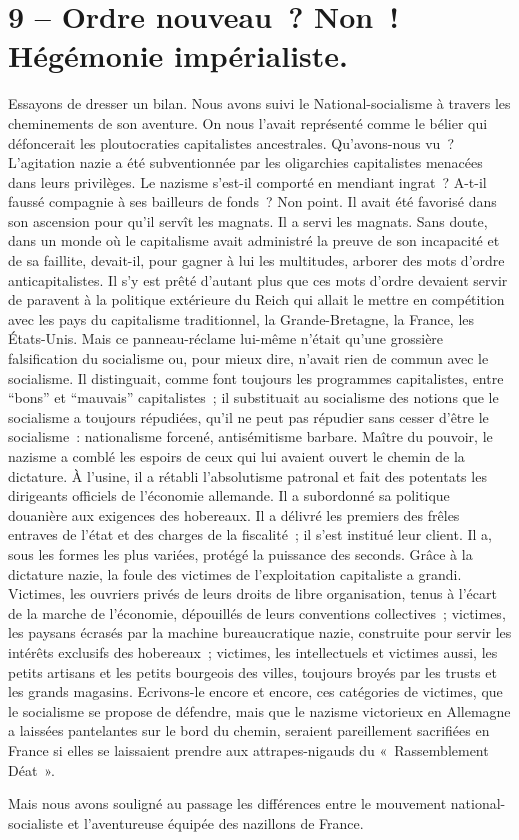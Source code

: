 \documentclass[french,twoside]{book} %
\begin{document}
\section[9 – Ordre nouveau ? Non ! Hégémonie impérialiste.]{9 – Ordre nouveau ? Non ! Hégémonie impérialiste.}
\noindent Essayons de dresser un bilan. Nous avons suivi le National-socialisme à travers les cheminements de son aventure. On nous l’avait représenté comme le bélier qui défoncerait les ploutocraties capitalistes ancestrales. Qu’avons-nous vu ? L’agitation nazie a été subventionnée par les oligarchies capitalistes menacées dans leurs privilèges. Le nazisme s’est-il comporté en mendiant ingrat ? A-t-il faussé compagnie à ses bailleurs de fonds ? Non point. Il avait été favorisé dans son ascension pour qu’il servît les magnats. Il a servi les magnats. Sans doute, dans un monde où le capitalisme avait administré la preuve de son incapacité et de sa faillite, devait-il, pour gagner à lui les multitudes, arborer des mots d’ordre anticapitalistes. Il s’y est prêté d’autant plus que ces mots d’ordre devaient servir de paravent à la politique extérieure du Reich qui allait le mettre en compétition avec les pays du capitalisme traditionnel, la Grande-Bretagne, la France, les États-Unis. Mais ce panneau-réclame lui-même n’était qu’une grossière falsification du socialisme ou, pour mieux dire, n’avait rien de commun avec le socialisme. Il distinguait, comme font toujours les programmes capitalistes, entre “bons” et “mauvais” capitalistes ; il substituait au socialisme des notions que le socialisme a toujours répudiées, qu’il ne peut pas répudier sans cesser d’être le socialisme : nationalisme forcené, antisémitisme barbare. Maître du pouvoir, le nazisme a comblé les espoirs de ceux qui lui avaient ouvert le chemin de la dictature. À l’usine, il a rétabli l’absolutisme patronal et fait des potentats les dirigeants officiels de l’économie allemande. Il a subordonné sa politique douanière aux exigences des hobereaux. Il a délivré les premiers des frêles entraves de l’état et des charges de la fiscalité ; il s’est institué leur client. Il a, sous les formes les plus variées, protégé la puissance des seconds. Grâce à la dictature nazie, la foule des victimes de l’exploitation capitaliste a grandi. Victimes, les ouvriers privés de leurs droits de libre organisation, tenus à l’écart de la marche de l’économie, dépouillés de leurs conventions collectives ; victimes, les paysans écrasés par la machine bureaucratique nazie, construite pour servir les intérêts exclusifs des hobereaux ; victimes, les intellectuels et victimes aussi, les petits artisans et les petits bourgeois des villes, toujours broyés par les trusts et les grands magasins. Ecrivons-le encore et encore, ces catégories de victimes, que le socialisme se propose de défendre, mais que le nazisme victorieux en Allemagne a laissées pantelantes sur le bord du chemin, seraient pareillement sacrifiées en France si elles se laissaient prendre aux attrapes-nigauds du « Rassemblement Déat ».\par
Mais nous avons souligné au passage les différences entre le mouvement national-socialiste et l’aventureuse équipée des nazillons de France.\par
\end{document}
